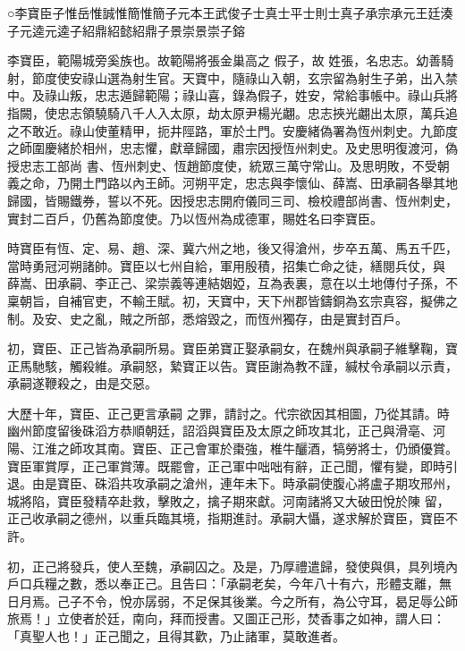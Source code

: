 
\begin{pinyinscope}

 ○李寶臣子惟岳惟誠惟簡惟簡子元本王武俊子士真士平士則士真子承宗承元王廷湊子元逵元逵子紹鼎紹懿紹鼎子景崇景崇子鎔



 李寶臣，範陽城旁奚族也。故範陽將張金巢高之
 假子，故
 姓張，名忠志。幼善騎射，節度使安祿山選為射生官。天寶中，隨祿山入朝，玄宗留為射生子弟，出入禁中。及祿山叛，忠志遁歸範陽；祿山喜，錄為假子，姓安，常給事帳中。祿山兵將指闕，使忠志領驍騎八千人入太原，劫太原尹楊光翽。忠志挾光翽出太原，萬兵追之不敢近。祿山使董精甲，扼井陘路，軍於土門。安慶緒偽署為恆州刺史。九節度之師圍慶緒於相州，忠志懼，獻章歸國，肅宗因授恆州刺史。及史思明復渡河，偽授忠志工部尚
 書、恆州刺史、恆趙節度使，統眾三萬守常山。及思明敗，不受朝義之命，乃開土門路以內王師。河朔平定，忠志與李懷仙、薛嵩、田承嗣各舉其地歸國，皆賜鐵券，誓以不死。因授忠志開府儀同三司、檢校禮部尚書、恆州刺史，實封二百戶，仍舊為節度使。乃以恆州為成德軍，賜姓名曰李寶臣。



 時寶臣有恆、定、易、趙、深、冀六州之地，後又得滄州，步卒五萬、馬五千匹，當時勇冠河朔諸帥。寶臣以七州自給，軍用殷積，招集亡命之徒，繕閱兵仗，與
 薛嵩、田承嗣、李正己、梁崇義等連結姻婭，互為表裏，意在以土地傳付子孫，不稟朝旨，自補官吏，不輸王賦。初，天寶中，天下州郡皆鑄銅為玄宗真容，擬佛之制。及安、史之亂，賊之所部，悉熔毀之，而恆州獨存，由是實封百戶。



 初，寶臣、正己皆為承嗣所易。寶臣弟寶正娶承嗣女，在魏州與承嗣子維擊鞠，寶正馬馳駭，觸殺維。承嗣怒，縶寶正以告。寶臣謝為教不謹，緘杖令承嗣以示責，承嗣遂鞭殺之，由是交惡。



 大歷十年，寶臣、正己更言承嗣
 之罪，請討之。代宗欲因其相圖，乃從其請。時幽州節度留後硃滔方恭順朝廷，詔滔與寶臣及太原之師攻其北，正己與滑亳、河陽、江淮之師攻其南。寶臣、正己會軍於棗強，椎牛釃酒，犒勞將士，仍頒優賞。寶臣軍賞厚，正己軍賞薄。既罷會，正己軍中咄咄有辭，正己聞，懼有變，即時引退。由是寶臣、硃滔共攻承嗣之滄州，連年未下。時承嗣使腹心將盧子期攻邢州，城將陷，寶臣發精卒赴救，擊敗之，擒子期來獻。河南諸將又大破田悅於陳
 留，正己收承嗣之德州，以重兵臨其境，指期進討。承嗣大懾，遂求解於寶臣，寶臣不許。



 初，正己將發兵，使人至魏，承嗣囚之。及是，乃厚禮遣歸，發使與俱，具列境內戶口兵糧之數，悉以奉正己。且告曰：「承嗣老矣，今年八十有六，形體支離，無日月焉。己子不令，悅亦孱弱，不足保其後業。今之所有，為公守耳，曷足辱公師旅焉！」立使者於廷，南向，拜而授書。又圖正己形，焚香事之如神，謂人曰：「真聖人也！」正己聞之，且得其歡，乃止諸軍，莫敢進者。




\end{pinyinscope}
